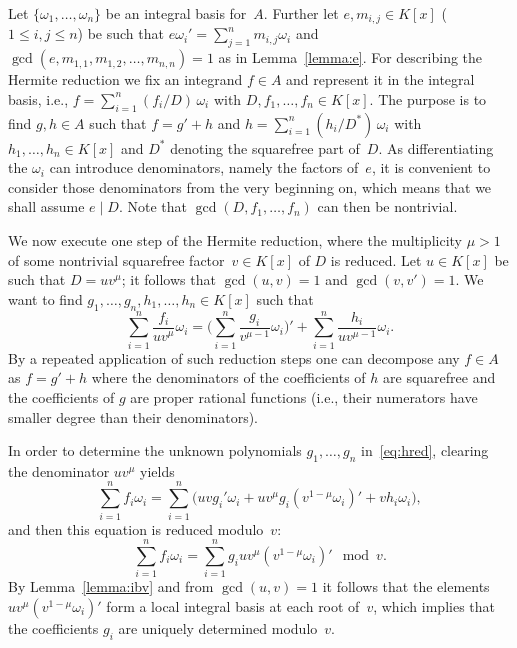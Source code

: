 \documentclass{sig-alternate}
\begin{document}
Let $\{\omega_1,\ldots,\omega_n\}$ be an integral basis for~$A$.
Further let $e,m_{i,j}\in K[x]$ ($1\leq i,j\leq n$) be such that
$e\omega_i'=\sum_{j=1}^n m_{i,j}\omega_i$ and
$\gcd(e,m_{1,1},m_{1,2},\ldots,m_{n,n})=1$ as in Lemma~\ref{lemma:e}. For describing
the Hermite reduction we fix an integrand $f\in A$ and represent it in the
integral basis, i.e., $f=\sum_{i=1}^n (f_i/D)\,\omega_i$ with
$D,f_1,\ldots,f_n\in K[x]$. The purpose is to find $g,h\in A$ such that
$f=g'+h$ and $h=\sum_{i=1}^n(h_i/D^\ast)\,\omega_i$ with $h_1,\ldots,h_n\in K[x]$
and $D^\ast$ denoting the squarefree part of~$D$.
As differentiating the $\omega_i$ can introduce
denominators, name\-ly the factors of~$e$, it is convenient to consider those
denominators from the very beginning on, which means that we shall assume
$e\mid D$. Note that $\gcd(D,f_1,\ldots,f_n)$ can then be nontrivial.

We now execute one step of the Hermite reduction, where the multiplicity
$\mu>1$ of some nontrivial squarefree factor~$v\in K[x]$ of $D$ is reduced.
Let $u\in K[x]$ be such that $D=uv^\mu$; it follows that $\gcd(u,v)=1$ and
$\gcd(v,v')=1$. We want to find $g_1,\ldots,g_n,h_1,\ldots,h_n\in K[x]$
such that
\begin{equation}\label{eq:hred}
  \sum_{i=1}^n \frac{f_i}{uv^\mu}\omega_i =
  \biggl(\sum_{i=1}^n\frac{g_i}{v^{\mu-1}}\omega_i\biggr)' +
  \sum_{i=1}^n \frac{h_i}{uv^{\mu-1}}\omega_i.
\end{equation}
By a repeated application of such reduction steps one can decompose any $f\in A$
as $f=g'+h$ where the denominators of the coefficients of $h$ are squarefree
and the coefficients of $g$ are proper rational functions (i.e., their numerators
have smaller degree than their denominators).

In order to determine the unknown polynomials $g_1,\ldots,g_n$ in~\eqref{eq:hred},
clearing the denominator $uv^\mu$ yields
\begin{equation}\label{eq:clear}
  \sum_{i=1}^n f_i\omega_i = \sum_{i=1}^n \biggl( uvg_i'\omega_i +
  uv^\mu g_i\left(v^{1-\mu}\omega_i\right)' + vh_i\omega_i \biggr),
\end{equation}
and then this equation is reduced modulo~$v$:
\begin{equation}\label{eq:modv}
  \sum_{i=1}^n f_i\omega_i =
  \sum_{i=1}^n g_iuv^\mu\left(v^{1-\mu}\omega_i\right)' \mod v.
\end{equation}
By Lemma~\ref{lemma:ibv} and from $\gcd(u,v)=1$ it follows that
the elements $uv^\mu\left(v^{1-\mu}\omega_i\right)'$ form a local integral basis
at each root of~$v$, which implies that the coefficients $g_i$ are
uniquely determined modulo~$v$.
\end{document}
